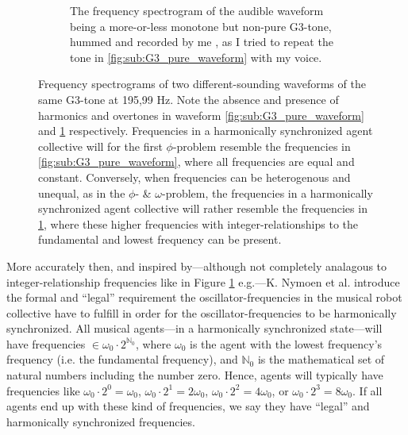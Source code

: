 \begin{figure}[ht!]
\begin{subfigure}[t]{.5\textwidth}
			\caption{The frequency spectrogram of the audible waveform being a more-or-less monotone but non-pure G3-tone, hummed and recorded by me \cite{}, as I tried to repeat the tone in \ref{fig:sub:G3_pure_waveform} with my voice.}
			\label{fig:sub:G3_hummed_waveform}
		\end{subfigure}
	\caption[Frequency spectrograms illustrating the absence and presence of harmonics and overtones in audible waveforms]{Frequency spectrograms of two different-sounding waveforms of the same G3-tone at 195,99 Hz. Note the absence and presence of harmonics and overtones in waveform \ref{fig:sub:G3_pure_waveform} and \ref{fig:sub:G3_hummed_waveform} respectively. Frequencies in a harmonically synchronized agent collective will for the first $\phi$-problem resemble the frequencies in \ref{fig:sub:G3_pure_waveform}, where all frequencies are equal and constant. Conversely, when frequencies can be heterogenous and unequal, as in the $\phi$- \& $\omega$-problem, the frequencies in a harmonically synchronized agent collective will rather resemble the frequencies in \ref{fig:sub:G3_hummed_waveform}, where these higher frequencies with integer-relationships to the fundamental and lowest frequency can be present.}
	\label{fig:frequency_spectrograms}
\end{figure}

More accurately then, and inspired by—although not completely analagous to integer-relationship frequencies like in Figure \ref{fig:sub:G3_hummed_waveform} e.g.—K. Nymoen et al. introduce the formal and ``legal'' requirement the oscillator-frequencies in the musical robot collective have to fulfill in order for the oscillator-frequencies to be harmonically synchronized. All musical agents—in a harmonically synchronized state—will have frequencies $\in \omega_{0} \cdot 2^{\mathbb{N}_0}$, where $\omega_{0}$ is the agent with the lowest frequency's frequency (i.e. the fundamental frequency), and $\mathbb{N}_0$ is the mathematical set of natural numbers including the number zero. Hence, agents will typically have frequencies like $\omega_{0} \cdot 2^0 = \omega_{0}$, $\omega_{0} \cdot 2^1 = 2\omega_{0}$, $\omega_{0} \cdot 2^2 = 4\omega_{0}$, or $\omega_{0} \cdot 2^3 = 8\omega_{0}$. If all agents end up with these kind of frequencies, we say they have ``legal'' and harmonically synchronized frequencies.







